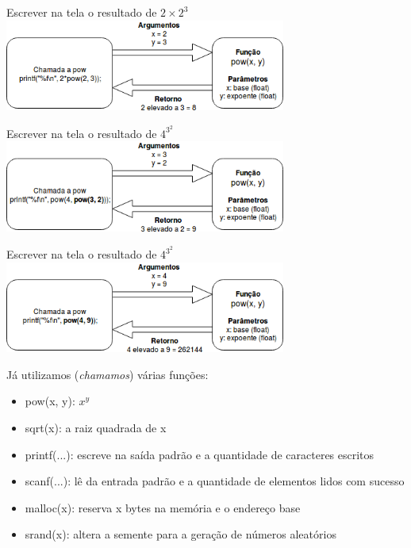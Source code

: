 \documentclass[portuguese,10pt,xcolor=table]{bredelebeamer}
\begin{document}
	\begin{frame}
		Escrever na tela o resultado de $2 \times 2^3$\\
			\includegraphics[height=3.0cm]{funcao1.png}\\
	\end{frame} 
	\begin{frame}
		Escrever na tela o resultado de $4^{3^2}$\\
			\includegraphics[height=3.0cm]{funcao2.png}\\
	\end{frame} 
	\begin{frame}
		Escrever na tela o resultado de $4^{3^2}$\\
			\includegraphics[height=3.0cm]{funcao3.png}\\
	\end{frame} 

	\begin{frame}
		Já utilizamos (\textit{chamamos}) várias funções:
		\begin{itemize}
			\item pow(x, y):  $x^y$
			\item sqrt(x):  a raiz quadrada de x
			\item printf(...): escreve na saída padrão e  a quantidade de caracteres escritos
			\item scanf(...): lê da entrada padrão e  a quantidade de elementos lidos com sucesso
			\item malloc(x): reserva x bytes na memória e  o endereço base
			\item srand(x): altera a semente para a geração de números aleatórios
		\end{itemize}		
	\end{frame} 
\end{document}
